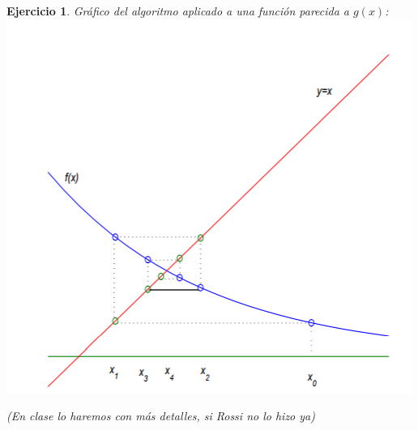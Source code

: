 \documentclass{article}
\newtheorem{exercise}{Ejercicio}
\begin{document}
\begin{exercise}
 Gráfico del algoritmo aplicado a una función parecida a $g(x)$: \\
 \includegraphics{PuntoFijoEjemplo.png}
 
 (En clase lo haremos con más detalles, si Rossi no lo hizo ya)
\end{exercise}
\end{document}
